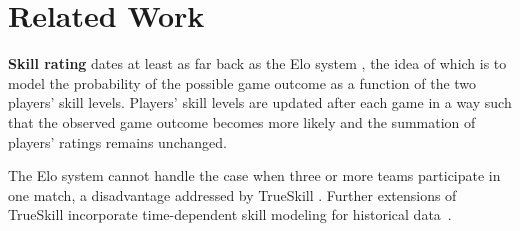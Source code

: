 \documentclass[runningheads,a4paper]{llncs}
\begin{document}

\section{Related Work}

{\bf Skill rating} dates at least as far back as the Elo system
\cite{elo78TheRatingOfChessPlayers}, the idea of which is to model the
probability of the possible game outcome as a function of the two
players' skill levels. Players' skill levels are updated after each
game in a way such that the observed game outcome becomes more likely
and the summation of players' ratings remains unchanged.

The Elo system cannot handle the case when three or more teams
participate in one match, a disadvantage addressed by TrueSkill
\cite{herbrich06569}. %
Further extensions of TrueSkill incorporate time-dependent
skill modeling for historical data~\cite{dangauthier07337}.

\end{document}

